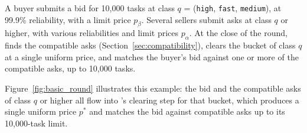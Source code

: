 \begin{example}
\label{ex:basic_round}
A buyer submits a bid for 10,000 tasks at class
$q$ = (\texttt{high}, \texttt{fast}, \texttt{medium}), at 99.9\%
reliability, with a limit price $p_\beta$. Several sellers submit asks at
class $q$ or higher, with various reliabilities and limit prices $p_\alpha$.
At the close of the round, \NoesisMarket{} finds the compatible asks
(Section~\ref{sec:compatibility}), clears the bucket of class $q$ at a single
uniform price, and matches the buyer's bid against one or more of the
compatible asks, up to 10,000 tasks.
\end{example}

Figure~\ref{fig:basic_round} illustrates this example: the bid and the
compatible asks of class $q$ or higher all flow into \NoesisMarket's
clearing step for that bucket, which produces a single uniform price $p^*$ and
matches the bid against compatible asks up to its 10,000-task limit.

